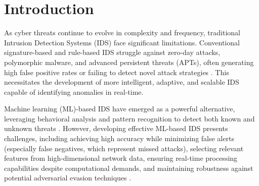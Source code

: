 \documentclass[sigconf,screen,final,nonacm]{acmart}
\begin{document}


\maketitle

\section{Introduction}
As cyber threats continue to evolve in complexity and frequency, traditional Intrusion Detection Systems (IDS) face significant limitations. Conventional signature-based and rule-based IDS struggle against zero-day attacks, polymorphic malware, and advanced persistent threats (APTs), often generating high false positive rates or failing to detect novel attack strategies \cite{tavallaee2009detailed}. This necessitates the development of more intelligent, adaptive, and scalable IDS capable of identifying anomalies in real-time.

Machine learning (ML)-based IDS have emerged as a powerful alternative, leveraging behavioral analysis and pattern recognition to detect both known and unknown threats \cite{indra2024ensemble}. However, developing effective ML-based IDS presents challenges, including achieving high accuracy while minimizing false alerts (especially false negatives, which represent missed attacks), selecting relevant features from high-dimensional network data, ensuring real-time processing capabilities despite computational demands, and maintaining robustness against potential adversarial evasion techniques \cite{9887796}.
\end{document}
